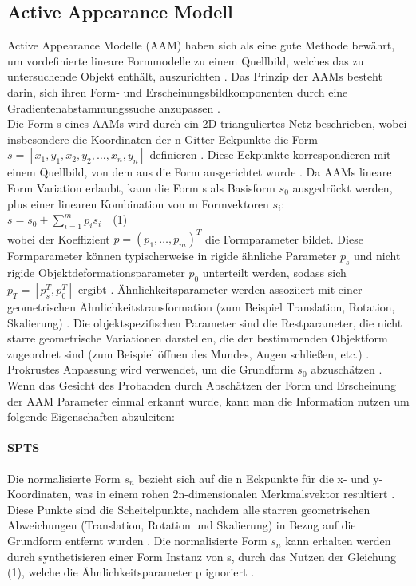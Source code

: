 \documentclass[12pt,a4paper,headinclude,twoside, plainheadsepline, open=right,numbers=noenddot]{scrreprt}
\begin{document}
\subsection{Active Appearance Modell}
Active Appearance Modelle (AAM) haben sich als eine gute Methode bewährt, um vordefinierte lineare Formmodelle zu einem Quellbild, welches das zu untersuchende Objekt enthält, auszurichten \cite{Lucey2010CK+}. Das Prinzip der AAMs besteht darin, sich ihren Form- und Erscheinungsbildkomponenten durch eine Gradientenabstammungssuche anzupassen \cite{Lucey2010CK+}. \\
Die Form s eines AAMs wird durch ein 2D trianguliertes Netz beschrieben, wobei insbesondere die Koordinaten der n Gitter Eckpunkte die Form $s = [x_1, y_1, x_2, y_2, \ldots, x_n, y_n]$ definieren \cite{Lucey2010CK+}. Diese Eckpunkte korrespondieren mit einem Quellbild, von dem aus die Form ausgerichtet wurde \cite{Lucey2010CK+}. Da AAMs lineare Form Variation erlaubt, kann die Form s als Basisform $s_0$ ausgedrückt werden, plus einer linearen Kombination von m Formvektoren $s_i$: \\
$s=s_0+\sum_{i=1}^{m} p_i s_i$  \,\,	(1) \cite{Lucey2010CK+} \\
wobei der Koeffizient $p = (p_1, …, p_m)^T$ die Formparameter bildet. Diese Formparameter können typischerweise in rigide ähnliche Parameter $p_s$ und nicht rigide Objektdeformationsparameter $p_0$ unterteilt werden, sodass sich $p_T = [p^{T}_{s}, p^{T}_{0}]$ ergibt \cite{Lucey2010CK+}. Ähnlichkeitsparameter werden assoziiert mit einer geometrischen Ähnlichkeitstransformation (zum Beispiel Translation, Rotation, Skalierung) \cite{Lucey2010CK+}. Die objektspezifischen Parameter sind die Restparameter, die nicht starre geometrische Variationen darstellen, die der bestimmenden Objektform zugeordnet sind (zum Beispiel öffnen des Mundes, Augen schließen, etc.) \cite{Lucey2010CK+}. Prokrustes Anpassung wird verwendet, um die Grundform $s_0$ abzuschätzen \cite{Lucey2010CK+}.\\
Wenn das Gesicht des Probanden durch Abschätzen der Form und Erscheinung der AAM Parameter einmal erkannt wurde, kann man die Information nutzen um folgende Eigenschaften abzuleiten:
\paragraph{SPTS}
Die normalisierte Form $s_n$ bezieht sich auf die n Eckpunkte für die x- und y-Koordinaten, was in einem rohen 2n-dimensionalen  Merkmalsvektor resultiert \cite{Lucey2010CK+}. Diese Punkte sind die Scheitelpunkte, nachdem alle starren geometrischen Abweichungen (Translation, Rotation und Skalierung) in Bezug auf die Grundform entfernt wurden \cite{Lucey2010CK+}. Die normalisierte Form $s_n$ kann erhalten werden durch synthetisieren einer Form Instanz von s, durch das Nutzen der Gleichung (1), welche die Ähnlichkeitsparameter p ignoriert \cite{Lucey2010CK+}. 
\end{document}
